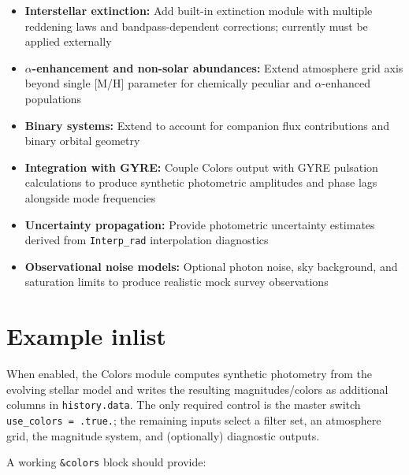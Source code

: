 \documentclass[linenumbers,apj,twocolumn, floatfix]{aastex701} \usepackage{amsmath} \usepackage{longtable} \usepackage{graphicx} \usepackage{ulem} \usepackage{xcolor} \usepackage{lettrine} \usepackage{yfonts} \usepackage{rotating}
\begin{document}
\begin{itemize}
    \item \textbf{Interstellar extinction:} Add built-in extinction module with multiple reddening laws and bandpass-dependent corrections; currently must be applied externally
    \item \textbf{$\alpha$-enhancement and non-solar abundances:} Extend atmosphere grid axis beyond single [M/H] parameter for chemically peculiar and $\alpha$-enhanced populations
    \item \textbf{Binary systems:} Extend to account for companion flux contributions and binary orbital geometry
    \item \textbf{Integration with GYRE:} Couple Colors output with GYRE pulsation calculations to produce synthetic photometric amplitudes and phase lags alongside mode frequencies
    \item \textbf{Uncertainty propagation:} Provide photometric uncertainty estimates derived from \texttt{Interp\_rad} interpolation diagnostics
    \item \textbf{Observational noise models:} Optional photon noise, sky background, and saturation limits to produce realistic mock survey observations
\end{itemize}


\section{Example inlist}
\label{app:config}

When enabled, the Colors module computes synthetic photometry from the evolving stellar model and writes the resulting magnitudes/colors as additional columns in \texttt{history.data}.
The only required control is the master switch \texttt{use\_colors = .true.}; the remaining inputs select a filter set, an atmosphere grid, the magnitude system, and (optionally) diagnostic outputs.

A working \texttt{\&colors} block should provide:
\end{document}
